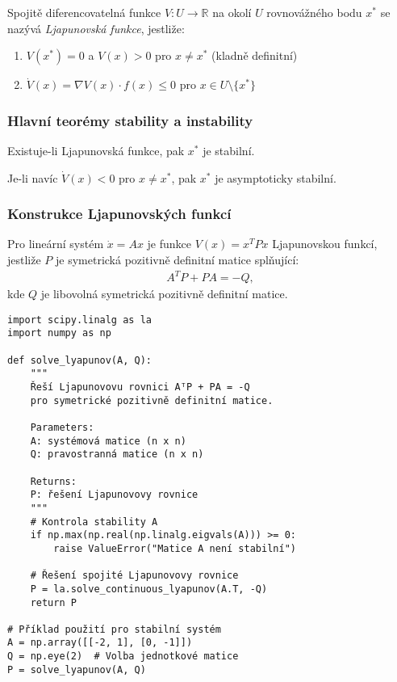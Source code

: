 \begin{definition}
Spojitě diferencovatelná funkce $V: U \to \mathbb{R}$ na okolí $U$ rovnovážného bodu $x^*$ se nazývá \emph{Ljapunovská funkce}, jestliže:
\begin{enumerate}
\item $V(x^*) = 0$ a $V(x) > 0$ pro $x \neq x^*$ (kladně definitní)
\item $\dot{V}(x) = \nabla V(x) \cdot f(x) \leq 0$ pro $x \in U \setminus \{x^*\}$
\end{enumerate}
\end{definition}

\subsubsection{Hlavní teorémy stability a instability}

\begin{theorem}
Existuje-li Ljapunovská funkce, pak $x^*$ je stabilní.
\end{theorem}

\begin{theorem}
Je-li navíc $\dot{V}(x) < 0$ pro $x \neq x^*$, pak $x^*$ je asymptoticky stabilní.
\end{theorem}

\subsubsection{Konstrukce Ljapunovských funkcí}

\begin{theorem}
Pro lineární systém $\dot{x} = Ax$ je funkce $V(x) = x^T P x$ Ljapunovskou funkcí, jestliže $P$ je symetrická pozitivně definitní matice splňující:
\begin{align*}
A^T P + P A = -Q,
\end{align*}
kde $Q$ je libovolná symetrická pozitivně definitní matice.
\end{theorem}

\begin{pseudocode}
\begin{verbatim}
import scipy.linalg as la
import numpy as np

def solve_lyapunov(A, Q):
    """
    Řeší Ljapunovovu rovnici AᵀP + PA = -Q
    pro symetrické pozitivně definitní matice.
    
    Parameters:
    A: systémová matice (n x n)
    Q: pravostranná matice (n x n)
    
    Returns:
    P: řešení Ljapunovovy rovnice
    """
    # Kontrola stability A
    if np.max(np.real(np.linalg.eigvals(A))) >= 0:
        raise ValueError("Matice A není stabilní")
    
    # Řešení spojité Ljapunovovy rovnice
    P = la.solve_continuous_lyapunov(A.T, -Q)
    return P

# Příklad použití pro stabilní systém
A = np.array([[-2, 1], [0, -1]])
Q = np.eye(2)  # Volba jednotkové matice
P = solve_lyapunov(A, Q)
\end{verbatim}
\end{pseudocode}

